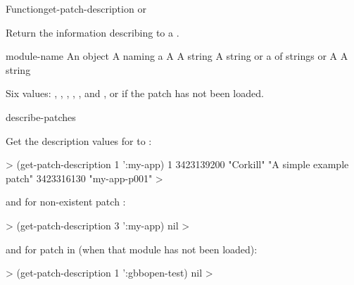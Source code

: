 \documentclass[10pt,twoside,english,pdftex]{article}
\begin{document}
\begin{functiondoc}{Function}{get-patch-description}%
  {
    or \nil}
%

\fnsyntax 

\fnpurpose Return the information describing   to a
.

\fnpackage {}

\fnmodule {}

\fnargs
\begin{args}{module-name}
\arg[id] An object
 A  naming a 
\arg[date] A 
\arg[author] A string
\arg[description] A string or a  of strings or \nil
{} A 
 A string
\end{args}

\fnreturns Six values: , , ,
, , and
, or \nil{} if the patch has not been loaded.

\fnerrors
\modulenotdefined

\begin{alsos}{describe-patches}
\also[patch]
\end{alsos}

\fnexamples
%
Get the description values for   to 
:
%
\W\supp
\begin{example}
  > (get-patch-description 1 ':my-app)
  1
  3423139200
  "Corkill"
  "A simple example patch"
  3423316130
  "my-app-p001"
  >
\end{example}
%
and for non-existent patch :
%
\W\supp\notpretop
\begin{example}
  > (get-patch-description 3 ':my-app)
  nil
  >
\end{example}
%
and for patch  in   (when
that module has not been loaded):
%
\W\supp\notpretop
\begin{example}
  > (get-patch-description 1 ':gbbopen-test)
  nil
  >
\end{example}

\end{functiondoc}
\end{document}
